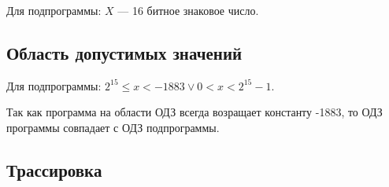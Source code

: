 Для подпрограммы: $X$ --- 16 битное знаковое число.
\subsection{Область допустимых значений}

Для подпрограммы: $2^{15} \leq x < -1883 \lor 0 < x < 2^{15} - 1$.

Так как программа на области ОДЗ всегда возращает константу -1883, то ОДЗ программы совпадает
с ОДЗ подпрограммы.

\subsection{Трассировка}

